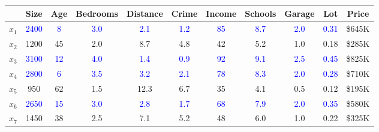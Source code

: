   \begin{example}
    \begin{table}[H]
      \centering
      {\footnotesize 
      \begin{tabular}{|c|c|c|c|c|c|c|c|c|c|c|}
        \hline
        & Size & Age & Bedrooms & Distance & Crime & Income & Schools & Garage & Lot & Price \\
        \hline
        $x_1$ & \textcolor{blue}{2400} & \textcolor{blue}{8} & \textcolor{blue}{3.0} & \textcolor{blue}{2.1} & \textcolor{blue}{1.2} & \textcolor{blue}{85} & \textcolor{blue}{8.7} & \textcolor{blue}{2.0} & \textcolor{blue}{0.31} & \$645K \\
        \hline
        $x_2$ & \textcolor{green!50!black}{1200} & \textcolor{green!50!black}{45} & \textcolor{green!50!black}{2.0} & \textcolor{green!50!black}{8.7} & \textcolor{green!50!black}{4.8} & \textcolor{green!50!black}{42} & \textcolor{green!50!black}{5.2} & \textcolor{green!50!black}{1.0} & \textcolor{green!50!black}{0.18} & \$285K \\
        \hline
        $x_3$ & \textcolor{blue}{3100} & \textcolor{blue}{12} & \textcolor{blue}{4.0} & \textcolor{blue}{1.4} & \textcolor{blue}{0.9} & \textcolor{blue}{92} & \textcolor{blue}{9.1} & \textcolor{blue}{2.5} & \textcolor{blue}{0.45} & \$825K \\
        \hline
        $x_4$ & \textcolor{blue}{2800} & \textcolor{blue}{6} & \textcolor{blue}{3.5} & \textcolor{blue}{3.2} & \textcolor{blue}{2.1} & \textcolor{blue}{78} & \textcolor{blue}{8.3} & \textcolor{blue}{2.0} & \textcolor{blue}{0.28} & \$710K \\
        \hline
        $x_5$ & \textcolor{green!50!black}{950} & \textcolor{green!50!black}{62} & \textcolor{green!50!black}{1.5} & \textcolor{green!50!black}{12.3} & \textcolor{green!50!black}{6.7} & \textcolor{green!50!black}{35} & \textcolor{green!50!black}{4.1} & \textcolor{green!50!black}{0.5} & \textcolor{green!50!black}{0.12} & \$195K \\
        \hline
        $x_6$ & \textcolor{blue}{2650} & \textcolor{blue}{15} & \textcolor{blue}{3.0} & \textcolor{blue}{2.8} & \textcolor{blue}{1.7} & \textcolor{blue}{68} & \textcolor{blue}{7.9} & \textcolor{blue}{2.0} & \textcolor{blue}{0.35} & \$580K \\
        \hline
        $x_7$ & \textcolor{green!50!black}{1450} & \textcolor{green!50!black}{38} & \textcolor{green!50!black}{2.5} & \textcolor{green!50!black}{7.1} & \textcolor{green!50!black}{5.2} & \textcolor{green!50!black}{48} & \textcolor{green!50!black}{6.0} & \textcolor{green!50!black}{1.0} & \textcolor{green!50!black}{0.22} & \$325K \\

\end{tabular}}
\end{table}
\end{example}
